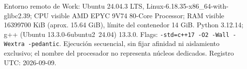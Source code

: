 Entorno remoto de Work: Ubuntu 24.04.3 LTS, Linux-6.18.35-x86\_64-with-glibc2.39; CPU visible AMD EPYC 9V74 80-Core Processor; RAM visible 16399700 KiB (aprox. 15.64 GiB), límite del contenedor 14 GiB. Python 3.12.14; g++ (Ubuntu 13.3.0-6ubuntu2~24.04) 13.3.0. Flags: \texttt{-std=c++17 -O2 -Wall -Wextra -pedantic}. Ejecución secuencial, sin fijar afinidad ni aislamiento exclusivo; el nombre del procesador no representa núcleos dedicados. Registro UTC: 2026-09-09.
